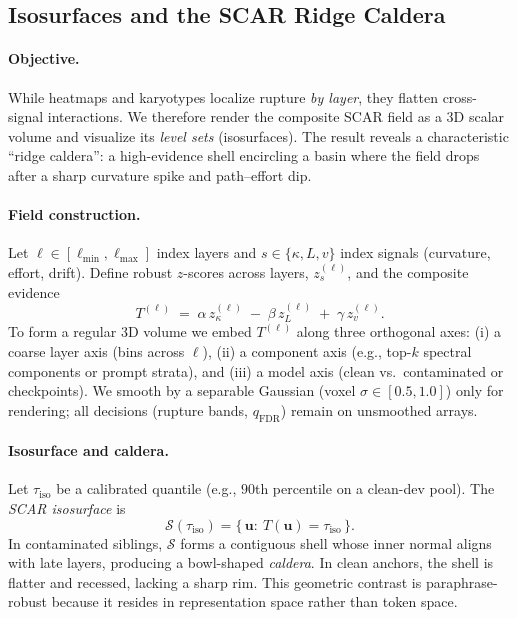 \documentclass[11pt]{article}
\begin{document}
\vspace{0.5em}
\subsection{Isosurfaces and the SCAR Ridge Caldera}
\label{subsec:isocaldera}

\paragraph{Objective.}
While heatmaps and karyotypes localize rupture \emph{by layer}, they flatten cross-signal interactions. We therefore render the composite SCAR field as a 3D scalar volume and visualize its \emph{level sets} (isosurfaces). The result reveals a characteristic ``ridge caldera'': a high-evidence shell encircling a basin where the field drops after a sharp curvature spike and path–effort dip.

\paragraph{Field construction.}
Let $\ell\in[\ell_{\min},\ell_{\max}]$ index layers and $s\in\{\kappa,L,v\}$ index signals (curvature, effort, drift).
Define robust $z$-scores across layers, $z_s^{(\ell)}$, and the composite evidence
\[
T^{(\ell)} \;=\; \alpha\,z_\kappa^{(\ell)} \;-\; \beta\,z_L^{(\ell)} \;+\; \gamma\,z_v^{(\ell)} .
\]
To form a regular 3D volume we embed $T^{(\ell)}$ along three orthogonal axes:
(i) a coarse layer axis (bins across $\ell$), (ii) a component axis (e.g., top-$k$ spectral components or prompt strata), and (iii) a model axis (clean vs.\ contaminated or checkpoints). We smooth by a separable Gaussian (voxel $\sigma\!\in\![0.5,1.0]$) only for rendering; all decisions (rupture bands, $q_{\mathrm{FDR}}$) remain on unsmoothed arrays.

\paragraph{Isosurface and caldera.}
Let $\tau_{\mathrm{iso}}$ be a calibrated quantile (e.g., $90$th percentile on a clean-dev pool). The \emph{SCAR isosurface} is
\[
\mathcal{S}(\tau_{\mathrm{iso}})=\{\,\mathbf{u}:\ T(\mathbf{u})=\tau_{\mathrm{iso}}\,\}.
\]
In contaminated siblings, $\mathcal{S}$ forms a contiguous shell whose inner normal aligns with late layers, producing a bowl-shaped \emph{caldera}. In clean anchors, the shell is flatter and recessed, lacking a sharp rim. This geometric contrast is paraphrase-robust because it resides in representation space rather than token space.
\end{document}

